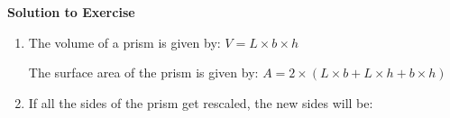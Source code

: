 {\begin{mdframed}[linewidth=4, leftmargin=40, rightmargin=40]
\begin{exercise}
        
        \vspace{5pt}
        \label{m39357*solfhsst!!!underscore!!!id166}\noindent\textbf{Solution to Exercise } \label{m39357*listfhsst!!!underscore!!!id166}\begin{enumerate}[noitemsep, label=\textbf{Step} \textbf{\arabic*}. ] 
            \leftskip=20pt\rightskip=\leftskip\item  
        \label{m39357*id63750}The volume of a prism is given by:
$V=L\ensuremath{\times}b\ensuremath{\times}h$\par 
        \label{m39357*id63774}The surface area of the prism is given by:
$A=2\ensuremath{\times}\left(L\ensuremath{\times}b+L\ensuremath{\times}h+b\ensuremath{\times}h\right)$\par 
        \item  
        \label{m39357*id63826}If all the sides of the prism get rescaled, the new sides will be:\par 
        \label{m39357*id63830}\nopagebreak\noindent{}
    

\end{enumerate}
\end{exercise}
\end{mdframed}}
